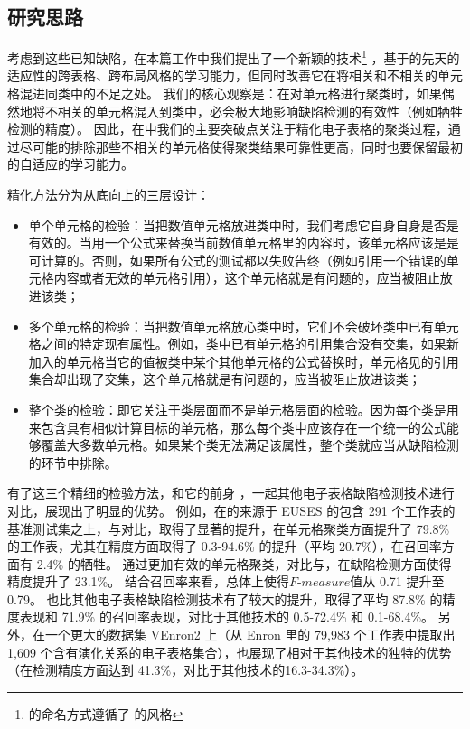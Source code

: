 \subsection{研究思路}

考虑到这些已知缺陷，在本篇工作中我们提出了一个新颖的技术\wa \footnote{\wa 的命名方式遵循了 \cu 的风格} \cite{li2019warder}，基于\cu 的先天的适应性的跨表格、跨布局风格的学习能力，但同时改善它在将相关和不相关的单元格混进同类中的不足之处。
我们的核心观察是：在对单元格进行聚类时，如果偶然地将不相关的单元格混入到类中，必会极大地影响缺陷检测的有效性（例如牺牲检测的精度）。
因此，在\wa 中我们的主要突破点关注于精化电子表格的聚类过程，通过尽可能的排除那些不相关的单元格使得聚类结果可靠性更高，同时也要保留\cu 最初的自适应的学习能力。

精化方法分为从底向上的三层设计：
\begin{itemize}
    \item 单个单元格的检验：当把数值单元格放进类中时，我们考虑它自身自身是否是有效的。当用一个公式来替换当前数值单元格里的内容时，该单元格应该是是可计算的。否则，如果所有公式的测试都以失败告终（例如引用一个错误的单元格内容或者无效的单元格引用），这个单元格就是有问题的，应当被阻止放进该类；
    \item 多个单元格的检验：当把数值单元格放心类中时，它们不会破坏类中已有单元格之间的特定现有属性。例如，类中已有单元格的引用集合没有交集，如果新加入的单元格当它的值被类中某个其他单元格的公式替换时，单元格见的引用集合却出现了交集，这个单元格就是有问题的，应当被阻止放进该类；
    \item 整个类的检验：即它关注于类层面而不是单元格层面的检验。因为每个类是用来包含具有相似计算目标的单元格，那么每个类中应该存在一个统一的公式能够覆盖大多数单元格。如果某个类无法满足该属性，整个类就应当从缺陷检测的环节中排除。
\end{itemize}

有了这三个精细的检验方法，\wa 和它的前身 \cu，一起其他电子表格缺陷检测技术进行对比，展现出了明显的优势。
例如，在\cu 的来源于 EUSES \cite{fisher2005euses} 的包含 291 个工作表的基准测试集之上，\wa 与\cu 对比，取得了显著的提升，在单元格聚类方面提升了 79.8\% 的工作表，尤其在精度方面取得了 0.3-94.6\% 的提升（平均 20.7\%），在召回率方面有 2.4\% 的牺牲。
\wa 通过更加有效的单元格聚类，对比与\cu，在缺陷检测方面使得精度提升了 23.1\%。
结合召回率来看，总体上使得$F\text{-}measure$值从 0.71 提升至 0.79。
\wa 也比其他电子表格缺陷检测技术有了较大的提升，取得了平均 87.8\% 的精度表现和 71.9\% 的召回率表现，对比于其他技术的 0.5-72.4\% 和 0.1-68.4\%。
另外，在一个更大的数据集 VEnron2 \cite{xu2017spreadcluster} 上（从 Enron \cite{hermans2015enron} 里的 79,983 个工作表中提取出 1,609 个含有演化关系的电子表格集合），\wa 也展现了相对于其他技术的独特的优势（在检测精度方面达到 41.3\%，对比于其他技术的16.3-34.3\%）。

